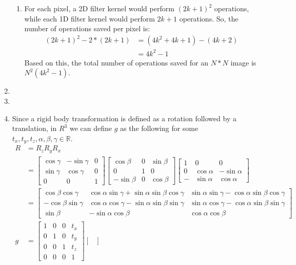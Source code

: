 \documentclass[12pt]{article}
\begin{document}
\begin{enumerate}
\begin{enumerate}
		\item For each pixel, a 2D filter kernel would perform $(2k + 1)^2$ operations, while each 1D filter kernel would perform $2k + 1$ operations. So, the number of operations saved per pixel is:
		\begin{align*}
		(2k +1) ^2 - 2 * (2k + 1) &= (4k^2 + 4k + 1) - (4k + 2) \\
		&= 4k^2 - 1
		\end{align*}
		Based on this, the total number of operations saved for an $N*N$ image is $\boxed{N^2(4k^2 - 1)}$.
	\end{enumerate}
	\item 
	\item
	\item Since a rigid body transformation is defined as a rotation followed by a translation, in $R^3$ we can define $g$ as the following for some $t_x, t_y, t_z, \alpha, \beta, \gamma \in \mathbb{R}$.
	\begin{align*}
	R &= R_zR_yR_x \\
	&= 
	\begin{bmatrix} \cos\gamma & -\sin\gamma & 0 \\ \sin\gamma & \cos\gamma & 0 \\ 0 & 0 & 1 \end{bmatrix}
	\begin{bmatrix} \cos\beta & 0 & \sin\beta \\ 0 & 1 & 0 \\ -\sin\beta & 0 & \cos\beta \end{bmatrix} 
	\begin{bmatrix} 1 & 0 & 0 \\ 0 & \cos\alpha & -\sin\alpha \\ - & \sin\alpha & \cos\alpha \end{bmatrix} \\
	&= \begin{bmatrix}
	\cos\beta \cos\gamma & \cos\alpha \sin\gamma+ \sin\alpha \sin\beta \cos\gamma & \sin\alpha \sin\gamma - \cos\alpha \sin\beta \cos\gamma \\
	-\cos\beta \sin\gamma & \cos\alpha \cos\gamma - \sin\alpha \sin\beta \sin\gamma & \sin\alpha \cos\gamma - \cos\alpha \sin\beta \sin\gamma \\
	\sin\beta & -\sin\alpha \cos\beta & \cos\alpha\cos\beta
	\end{bmatrix}\\
	g &= \begin{bmatrix} 1 & 0 & 0 & t_x \\ 0 & 1 & 0 & t_y \\ 0 & 0 & 1 & t_z \\ 0 & 0 & 0 & 1 \end{bmatrix}\begin{bmatrix}

\end{bmatrix}
\end{align*}
\end{enumerate}
\end{document}
